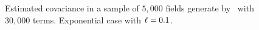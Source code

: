 \begin{figure}[H]
 \centering
 \caption{Estimated covariance in a sample of $5,000$ fields generate by \kle\ with $30,000$ terms. Exponential case with $\ell = 0.1$.}
 \label{covar_expKL1}
\end{figure}
